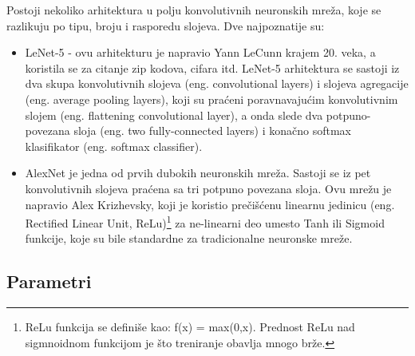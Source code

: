 \documentclass[a4paper]{article}
\begin{document}
Postoji nekoliko arhitektura u polju konvolutivnih neuronskih mreža, koje se razlikuju po tipu, broju i rasporedu slojeva. Dve najpoznatije su:

\begin{itemize}

\item LeNet-5 - ovu arhitekturu je napravio Yann LeCunn krajem 20. veka, a koristila se za citanje zip kodova, cifara itd. LeNet-5 arhitektura se sastoji iz dva skupa konvolutivnih slojeva (eng. convolutional layers) i slojeva agregacije (eng. average pooling layers), koji su praćeni poravnavajućim konvolutivnim slojem (eng. flattening convolutional layer), a onda slede dva potpuno-povezana sloja (eng. two fully-connected layers) i konačno softmax klasifikator (eng. softmax classifier).

\item AlexNet je jedna od prvih dubokih neuronskih mreža. Sastoji se iz pet konvolutivnih slojeva praćena sa tri potpuno povezana sloja.
Ovu mrežu je napravio Alex Krizhevsky, koji je koristio prečišćenu linearnu jedinicu (eng. Rectified Linear Unit, ReLu)\footnote{ReLu funkcija se definiše kao: f(x) = max(0,x). Prednost ReLu nad sigmnoidnom funkcijom je što treniranje obavlja mnogo brže.} za ne-linearni deo umesto Tanh ili Sigmoid funkcije, koje su bile standardne za tradicionalne neuronske mreže.




\end{itemize}



\subsection{Parametri}
\end{document}

